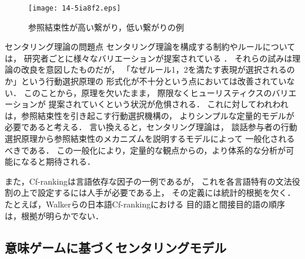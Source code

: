\documentclass[japanese]{jnlp_1.3e}
\renewcommand{\paragraph}{}
\begin{document}
\begin{figure}[t]
\begin{center}
      \texttt{[image: 14-5ia8f2.eps]}
  \caption{参照結束性が高い繋がり，低い繋がりの例}
  \label{fig:coherence}
 \end{center}
\end{figure}


\paragraph{センタリング理論の問題点}
センタリング理論を構成する制約やルールについては，
研究者ごとに様々なバリエーションが提案されている ．
それらの試みは理論の改良を意図したものだが，
「なぜルール1，2を満たす表現が選択されるのか」という行動選択原理の
形式化が不十分という点においては改善されていない．
このことから，原理を欠いたまま，
際限なくヒューリスティクスのバリエーションが
提案されていくという状況が危惧される．
これに対してわれわれは，参照結束性を引き起こす行動選択機構の，
よりシンプルな定量的モデルが必要であると考える．
言い換えると，センタリング理論は，
談話参与者の行動選択原理から参照結束性のメカニズムを説明するモデルによって
一般化されるべきである．
この一般化により，定量的な観点からの，より体系的な分析が可能になると期待される．

また，Cf-rankingは言語依存な因子の一例であるが，
これを各言語特有の文法役割の上で設定するには人手が必要である上，
その定義には統計的根拠を欠く．
たとえば，Walkerら\citeyear{walker1994}の日本語Cf-rankingにおける
目的語と間接目的語の順序は，根拠が明らかでない．





\subsection{意味ゲームに基づくセンタリングモデル}
\label{sec:mgcm}
\end{document}

